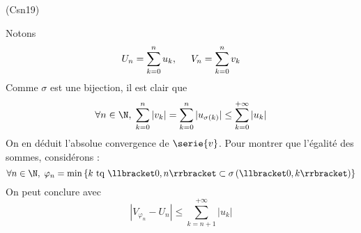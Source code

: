 \begin{tiny}(Csn19)\end{tiny} Notons 
\begin{displaymath}
  U_n = \sum_{k=0}^nu_k,\hspace{0.5cm} V_n = \sum_{k=0}^nv_k
\end{displaymath}
Comme $\sigma$ est une bijection, il est clair que
\begin{displaymath}
\forall n \in \N, \; \sum_{k=0}^n|v_k| = \sum_{k=0}^n|u_{\sigma(k)}| \leq \sum_{k=0}^{+\infty}|u_{k}|   
\end{displaymath}
On en déduit l'absolue convergence de $\serie{v}$.\newline
Pour montrer que l'égalité des sommes, considérons :
\begin{displaymath}
\forall n\in \N, \;
\varphi_n = 
\min\left\lbrace k\text{ tq } \llbracket 0,n \rrbracket \subset \sigma\left(\llbracket 0,k \rrbracket \right) \right\rbrace 
\end{displaymath}
On peut conclure avec
\begin{displaymath}
\left|V_{\varphi_n}-U_n \right| \leq \sum_{k=n+1}^{+\infty}|u_{k}|  
\end{displaymath}
